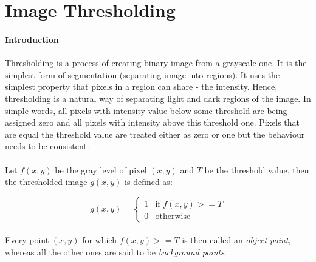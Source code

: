\paragraph{}

\section{Image Thresholding}\label{sec:image_thresholding}
\paragraph{Introduction}
Thresholding is a process of creating binary image from a grayscale one.\cite{digital-image-processing} It is the simplest form of segmentation (separating image into regions). It uses the simplest property that pixels in a region can share - the intensity. Hence, thresholding is a natural way of separating light and dark regions of the image. In simple words, all pixels with intensity value below some threshold are being assigned zero and all pixels with intensity above this threshold one. Pixels that are equal the threshold value are treated either as zero or one but the behaviour needs to be consistent. 

\paragraph{}
Let $f(x, y)$ be the gray level of pixel $(x, y)$ and $T$ be the threshold value, then the thresholded image $g(x, y)$ is defined as:

\begin{equation}
	g(x, y) = \begin{cases}
		1 & \text{if $f(x, y) >= T$}\\
		0 & \text{otherwise}
	\end{cases}
\end{equation}

\paragraph{}
Every point $(x, y)$ for which $f(x, y) >= T$ is then called an \textit{object point}, whereas all the other ones are said to be \textit{background points}.

